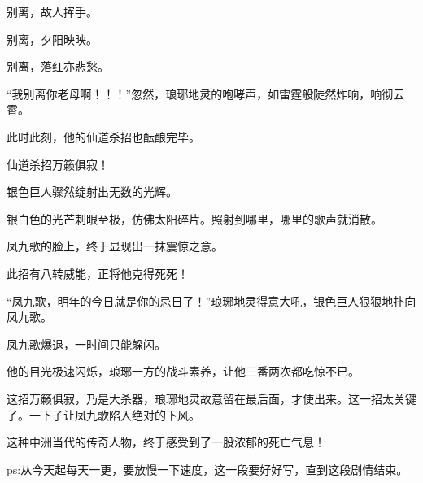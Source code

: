 \begin{this_body}
别离，故人挥手。

别离，夕阳映映。

别离，落红亦悲愁。

“我别离你老母啊！！！”忽然，琅琊地灵的咆哮声，如雷霆般陡然炸响，响彻云霄。

此时此刻，他的仙道杀招也酝酿完毕。

仙道杀招万籁俱寂！

银色巨人骤然绽射出无数的光辉。

银白色的光芒刺眼至极，仿佛太阳碎片。照射到哪里，哪里的歌声就消散。

凤九歌的脸上，终于显现出一抹震惊之意。

此招有八转威能，正将他克得死死！

“凤九歌，明年的今日就是你的忌日了！”琅琊地灵得意大吼，银色巨人狠狠地扑向凤九歌。

凤九歌爆退，一时间只能躲闪。

他的目光极速闪烁，琅琊一方的战斗素养，让他三番两次都吃惊不已。

这招万籁俱寂，乃是大杀器，琅琊地灵故意留在最后面，才使出来。这一招太关键了。一下子让凤九歌陷入绝对的下风。

这种中洲当代的传奇人物，终于感受到了一股浓郁的死亡气息！

ps:从今天起每天一更，要放慢一下速度，这一段要好好写，直到这段剧情结束。

\end{this_body}

